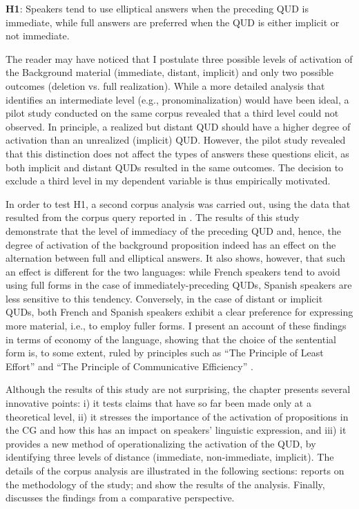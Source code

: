 \ea
\textbf{H1}: Speakers tend to use elliptical answers when the preceding QUD is immediate, while full answers are preferred when the QUD is either implicit or not immediate.\\
\z

The reader may have noticed that I postulate three possible levels of activation of the Background material (immediate, distant, implicit) and only two possible outcomes (deletion vs. full realization). While a more detailed analysis that identifies an intermediate level (e.g., pronominalization) would have been ideal, a pilot study conducted on the same corpus revealed that a third level could not observed. In principle, a realized but distant QUD should have a higher degree of activation than an unrealized (implicit) QUD. However, the pilot study revealed that this distinction does not affect the types of answers these questions elicit, as both implicit and distant QUDs resulted in the same outcomes. The decision to exclude a third level in my dependent variable is thus empirically motivated.

In order to test H1, a second corpus analysis was carried out, using the data that resulted from the corpus query reported in . The results of this study demonstrate that the level of immediacy of the preceding QUD and, hence, the degree of activation of the background proposition indeed has an effect on the alternation between full and elliptical answers. It also shows, however, that such an effect is different for the two languages: while French speakers tend to avoid using full forms in the case of immediately-preceding QUDs, Spanish speakers are less sensitive to this tendency. Conversely, in the case of distant or implicit QUDs, both French and Spanish speakers exhibit a clear preference for expressing more material, i.e., to employ fuller forms. I present an account of these findings in terms of economy of the language, showing that the choice of the sentential form is, to some extent, ruled by principles such as ``The Principle of Least Effort” \parencite{zipf1949human} and ``The Principle of Communicative Efficiency” \parencite{LevshinaMoran+2021, Levshina_2022}.

Although the results of this study are not surprising, the chapter presents several innovative points: i) it tests claims that have so far been made only at a theoretical level, ii) it stresses the importance of the activation of propositions in the CG and how this has an impact on speakers' linguistic expression, and iii) it provides a new method of operationalizing the activation of the QUD, by identifying three levels of distance (immediate, non-immediate, implicit).
The details of the corpus analysis are illustrated in the following sections:  reports on the methodology of the study;  and  show the results of the analysis. Finally,  discusses the findings from a comparative perspective. 


